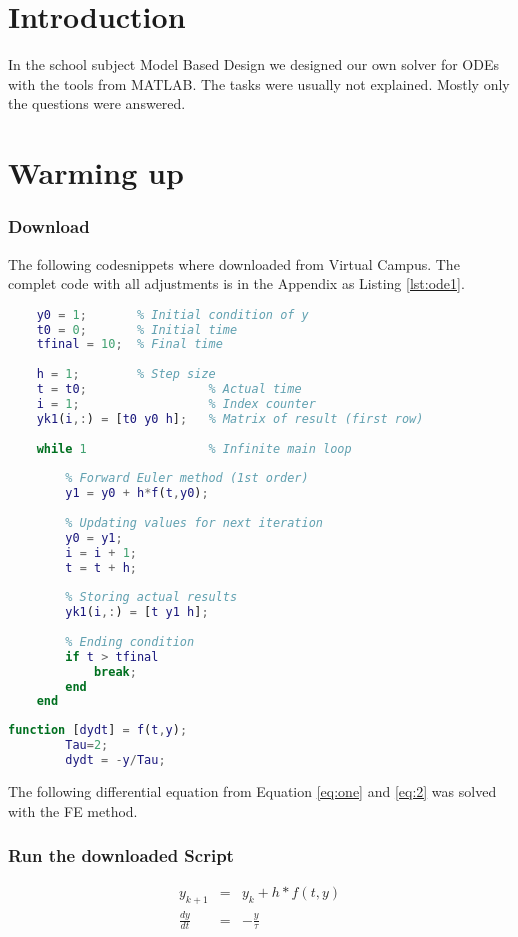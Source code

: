 \part{Introduction}
In the school subject Model Based Design we designed our own solver for ODEs with the tools from MATLAB.
The tasks were usually not explained. Mostly only the questions were answered.

\part{Warming up}
	\section{Download}
	The following codesnippets where downloaded from Virtual Campus. The complet code with all adjustments is in the Appendix as Listing \ref{lst:ode1}.
\begin{lstlisting}[caption={An abridged version of the Matlab code}, language=matlab, backgroundcolor = \color{lgray},label={lst:one}]
	%Startvalues
	y0 = 1;       % Initial condition of y
	t0 = 0;       % Initial time  
	tfinal = 10;  % Final time
	
	h = 1;        % Step size
	t = t0;                 % Actual time 
	i = 1;                  % Index counter 
	yk1(i,:) = [t0 y0 h];   % Matrix of result (first row)
	
	while 1                 % Infinite main loop
	
		% Forward Euler method (1st order)
		y1 = y0 + h*f(t,y0);
		
		% Updating values for next iteration
		y0 = y1;            
		i = i + 1;
		t = t + h;
		
		% Storing actual results
		yk1(i,:) = [t y1 h];
		
		% Ending condition
		if t > tfinal
			break;
		end    
	end			
\end{lstlisting}
		
		
\begin{lstlisting}[caption={The funcion in the MATLAB code from Listing \ref{lst:one} row 14}, language=matlab, backgroundcolor = \color{lgray}]
	function [dydt] = f(t,y);		
		Tau=2;         
		dydt = -y/Tau;		
\end{lstlisting}
	The following differential equation from Equation \ref{eq:one} and \ref{eq:2} was solved with the FE method.
	
	\section{Run the downloaded Script}
		\begin{eqnarray}
			y_{k+1} &=& y_k + h * f(t, y) \label{eq:one }\\
			\frac{dy}{dt} &=& -\frac{y}{\tau} \label{eq:2}
		\end{eqnarray}

